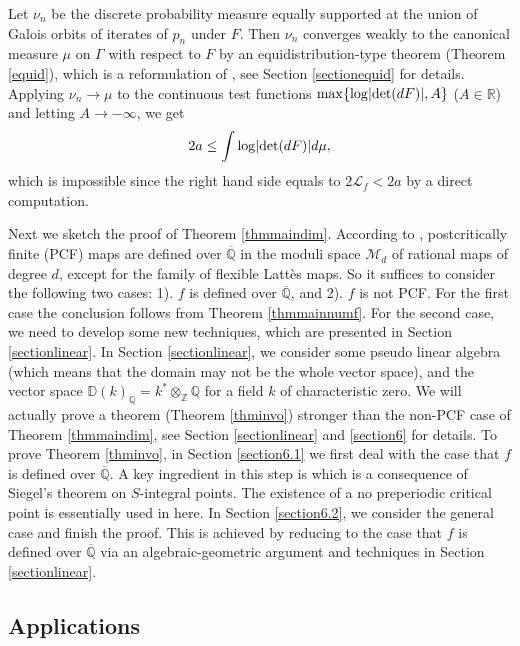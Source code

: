 \documentclass[12pt]{amsart}
\theoremstyle{plain}
\theoremstyle{remark}
\theoremstyle{definition}
\def\Z{\mathbb Z}
\def\Q{\mathbb Q}
\def\R{\mathbb R}
\def\D{\mathbb D}
\begin{document}
Let $\nu_n$ be the discrete probability measure equally supported at the union of Galois orbits of iterates of $p_n$ under $F$. 
Then $\nu_n$ converges weakly to the canonical measure $\mu$ on $\Gamma$ with respect to $F$ by an equidistribution-type theorem (Theorem \ref{equid}), 
which is  a reformulation of \cite[Theorem 3.1]{Yuan2008}, see Section \ref{sectionequid} for details. Applying $\nu_n\to\mu$ to the continuous test functions ${\rm max}\{{\rm log}\lvert{\rm det}(dF)\rvert,A\}$ ($A\in\R$) and letting $A\to-\infty$, we get $$2a\leq\int{\rm log}\lvert{\rm det}(dF)\rvert d\mu,$$ which is impossible since the right hand side equals to $2\mathcal{L}_f<2a$ by a direct computation. 


\medskip


\par Next we sketch the proof of Theorem \ref{thmmaindim}. According to \cite{Douady1993},  postcritically finite (PCF) maps are defined over $\overline{\Q}$ in the moduli space $\mathcal{M}_d$ of rational maps of degree $d$, except for the family of flexible Latt\`es maps. So it  suffices to consider the following two cases:  1).  $f$ is defined over $\overline{\Q}$, and 2). $f$ is not PCF.  For the first case the conclusion follows from Theorem \ref{thmmainnumf}. For the second case, we need to develop some new techniques, which are presented in Section \ref{sectionlinear}. In Section \ref{sectionlinear}, we consider some pseudo linear algebra (which means that the domain may not be the whole vector space), and the vector space $\D(k)_\Q=k^*\otimes_{\Z}\Q$ for a field $k$ of characteristic zero. We will actually prove a theorem (Theorem \ref{thminvo}) stronger than the non-PCF case of Theorem \ref{thmmaindim}, see Section \ref{sectionlinear} and \ref{section6} for details. 
 To prove Theorem \ref{thminvo}, in Section \ref{section6.1} we first deal with the case  that $f$ is defined over $\overline{\Q}$. A key ingredient in this step is \cite[Lemma 4.1]{Benedetto2012} which is a consequence of Siegel's theorem on $S$-integral points. 
 The existence of a no preperiodic critical point is essentially used in here. In Section \ref{section6.2}, we consider the general case and  finish the proof.  This  is achieved by reducing to the case that $f$ is defined over $\overline{\Q}$ via an algebraic-geometric argument and techniques in Section \ref{sectionlinear}.

\subsection{Applications}
\end{document}
